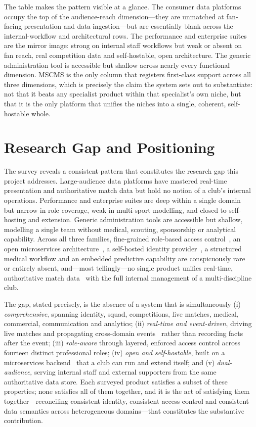 The table makes the pattern visible at a glance. The consumer data platforms occupy the top
of the audience-reach dimension---they are unmatched at fan-facing presentation and data
ingestion---but are essentially blank across the internal-workflow and architectural rows.
The performance and enterprise suites are the mirror image: strong on internal staff
workflows but weak or absent on fan reach, real competition data and self-hostable, open
architecture. The generic administration tool is accessible but shallow across nearly every
functional dimension. MSCMS is the only column that registers first-class support across all
three dimensions, which is precisely the claim the system sets out to substantiate: not that it
beats any specialist product within that specialist's own niche, but that it is the only
platform that unifies the niches into a single, coherent, self-hostable whole.

\section{Research Gap and Positioning}
\label{sec:lit-gap}

The survey reveals a consistent pattern that constitutes the research gap this project
addresses. Large-audience data platforms have mastered real-time presentation and
authoritative match data but hold no notion of a club's internal operations. Performance and
enterprise suites are deep within a single domain but narrow in role coverage, weak in
multi-sport modelling, and closed to self-hosting and extension. Generic administration tools
are accessible but shallow, modelling a single team without medical, scouting, sponsorship or
analytical capability. Across all three families, fine-grained role-based access
control~\cite{rbac}, an open microservices architecture~\cite{microservices}, a self-hosted
identity provider~\cite{keycloak}, a structured medical workflow and an embedded predictive
capability are conspicuously rare or entirely absent, and---most tellingly---no single product
unifies real-time, authoritative match data~\cite{footballdata} with the full internal
management of a multi-discipline club.

The gap, stated precisely, is the absence of a system that is simultaneously (i)
\emph{comprehensive}, spanning identity, squad, competitions, live matches, medical,
commercial, communication and analytics; (ii) \emph{real-time and event-driven}, driving
live matches and propagating cross-domain events~\cite{kafka} rather than recording facts
after the event; (iii) \emph{role-aware} through layered, enforced access control across
fourteen distinct professional roles; (iv) \emph{open and self-hostable}, built on a
microservices backend~\cite{springboot,springcloud} that a club can run and extend itself;
and (v) \emph{dual-audience}, serving internal staff and external supporters from the same
authoritative data store. Each surveyed product satisfies a subset of these properties; none
satisfies all of them together, and it is the act of satisfying them together---reconciling
consistent identity, consistent access control and consistent data semantics across
heterogeneous domains---that constitutes the substantive contribution.

